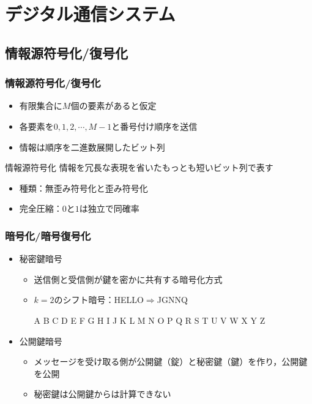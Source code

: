 \documentclass[dvipdfmx]{beamer}  %
\begin{document}
\section{デジタル通信システム}
\subsection{情報源符号化/復号化}
\begin{frame}
	\frametitle{情報源符号化/復号化}
	
	\begin{itemize}
		\item 有限集合に$M$個の要素があると仮定
		\item 各要素を$0, 1, 2, \cdots,M-1$と番号付け順序を送信
		\item 情報は順序を二進数展開したビット列
	\end{itemize}
	
	\begin{block}{情報源符号化}
		情報を冗長な表現を省いたもっとも短いビット列で表す
	\end{block}
	\begin{itemize}
		\item 種類：無歪み符号化と歪み符号化
		\item 完全圧縮：$0$と$1$は独立で同確率
	\end{itemize}
\end{frame}

\begin{frame}
	\frametitle{暗号化/暗号復号化}
	
	\begin{itemize}
		\item 秘密鍵暗号
		
		\begin{itemize}
			\item 送信側と受信側が鍵を密かに共有する暗号化方式
			\item $k=2$のシフト暗号：HELLO$\Longrightarrow$JGNNQ
			
			{\rm A B C D E F G H I J K L M N O P Q R S T U V W X Y Z}
		\end{itemize}
		
		\item 公開鍵暗号
		
		\begin{itemize}
			\item メッセージを受け取る側が公開鍵（錠）と秘密鍵（鍵）を作り，公開鍵を公開
			\item 秘密鍵は公開鍵からは計算できない
		\end{itemize}
	\end{itemize}
\end{frame}
\end{document}
